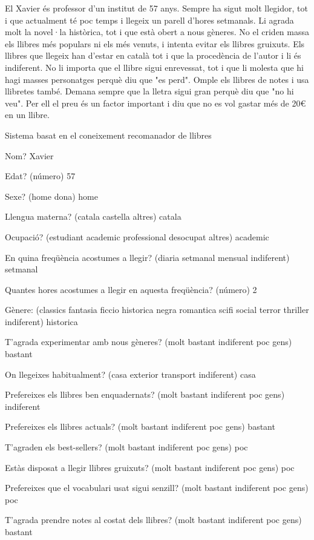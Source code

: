 El Xavier és professor d'un institut de 57 anys. Sempre ha sigut molt llegidor, tot i que actualment té poc temps i llegeix un parell d'hores setmanals. Li agrada molt la novel·la històrica, tot i que està obert a nous gèneres. No el criden massa els llibres més populars ni els més venuts, i intenta evitar els llibres gruixuts. Els llibres que llegeix han d'estar en català tot i que la procedència de l'autor i li és indiferent. No li importa que el llibre sigui enrevessat, tot i que li molesta que hi hagi masses personatges perquè diu que "es perd". Omple els llibres de notes i usa llibretes també. Demana sempre que la lletra sigui gran perquè diu que "no hi veu". Per ell el preu és un factor important i diu que no es vol gastar més de 20€ en un llibre.



Sistema basat en el coneixement recomanador de llibres

Nom? Xavier

Edat?  (número) 57

Sexe? (home dona) home

Llengua materna? (catala castella altres) catala

Ocupació? (estudiant academic professional desocupat altres) academic

En quina freqüència acostumes a llegir? (diaria setmanal mensual indiferent) setmanal

Quantes hores acostumes a llegir en aquesta freqüència? (número) 2

Gènere:  (classics fantasia ficcio historica negra romantica scifi social terror thriller indiferent) historica

T'agrada experimentar amb nous gèneres? (molt bastant indiferent poc gens) bastant

On llegeixes habitualment? (casa exterior transport indiferent) casa

Prefereixes els llibres ben enquadernats? (molt bastant indiferent poc gens) indiferent

Prefereixes els llibres actuals? (molt bastant indiferent poc gens) bastant

T'agraden els best-sellers? (molt bastant indiferent poc gens) poc

Estàs disposat a llegir llibres gruixuts? (molt bastant indiferent poc gens) poc

Prefereixes que el vocabulari usat sigui senzill? (molt bastant indiferent poc gens) poc

T'agrada prendre notes al costat dels llibres? (molt bastant indiferent poc gens) bastant

